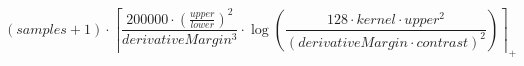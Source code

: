 \[\left(samples + 1\right) \cdot \left\lceil \frac{200000 \cdot \left(\frac{upper}{lower}\right)^{2}}{derivativeMargin^{3}} \cdot \log\left(\frac{128 \cdot kernel \cdot upper^{2}}{\left(derivativeMargin \cdot contrast\right)^{2}}\right) \right\rceil_{+}\]
